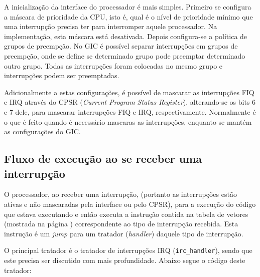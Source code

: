 A inicialização da interface do processador é mais simples. Primeiro se configura a máscara de prioridade da CPU, isto é, qual é o nível de prioridade mínimo que uma interrupção precisa ter para interromper aquele processador. Na implementação, esta máscara está desativada. Depois configura-se a política de grupos de preempção. No GIC é possível separar interrupções em grupos de preempção, onde se define se determinado grupo pode preemptar determinado outro grupo. Todas as interrupções foram colocadas no mesmo grupo e interrupções podem ser preemptadas.

Adicionalmente a estas configurações, é possível de mascarar as interrupções FIQ e IRQ através do CPSR (\emph{Current Program Status Register}), alterando-se os bits 6 e 7 dele, para mascarar interrupções FIQ e IRQ, respectivamente. Normalmente é o que é feito quando é necessário mascaras as interrupções, enquanto se mantém as configurações do GIC.

\subsection{Fluxo de execução ao se receber uma interrupção}

O processador, ao receber uma interrupção, (portanto as interrupções estão ativas e não mascaradas pela interface ou pelo CPSR), para a execução do código que estava executando e então executa a instrução contida na tabela de vetores (mostrada na página \pageref{dump}) correspondente ao tipo de interrupção recebida. Esta instrução é um \emph{jump} para um tratador (\emph{handler}) daquele tipo de interrupção.

O principal tratador é o tratador de interrupções IRQ (\verb+irc_handler+), sendo que este precisa ser discutido com mais profundidade. Abaixo segue o código deste tratador:

